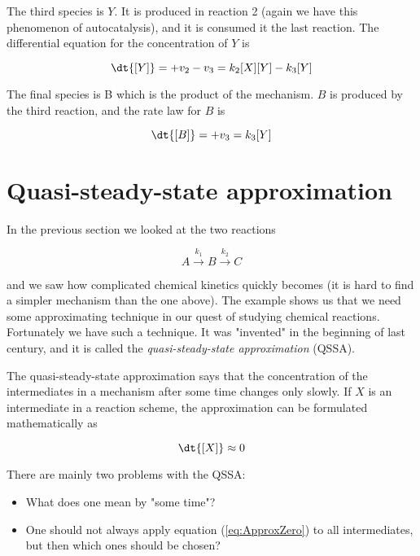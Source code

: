 \begin{example}
    The third species is $Y$. It is produced in reaction 2 (again we have this phenomenon of autocatalysis), and it is consumed it the last reaction. The differential equation for the concentration of $Y$ is

    \begin{equation}
        \dt{[Y]} = +v_2 - v_3 = k_2[X][Y] - k_3[Y]
    \end{equation}

    The final species is B which is the product of the mechanism. $B$ is produced by the third reaction, and the rate law for $B$ is

    \begin{equation}
        \dt{[B]} = +v_3 = k_3[Y]
    \end{equation}
\end{example}

\section{Quasi-steady-state approximation}
\label{sect:QSSA}

In the previous section we looked at the two reactions

\begin{equation}
    A \overset{k_1}{\rightarrow} B \overset{k_2}{\rightarrow} C
\end{equation}

and we saw how complicated chemical kinetics quickly becomes (it is hard to find a simpler mechanism than the one above). The example shows us that we need some approximating technique in our quest of studying chemical reactions. Fortunately we have such a technique. It was "invented" in the beginning of last century, and it is called the \textit{quasi-steady-state approximation} (QSSA).

The quasi-steady-state approximation says that the concentration of the intermediates in a mechanism after some time changes only slowly. If $X$ is an intermediate in a reaction scheme, the approximation can be formulated mathematically as

\begin{equation}
    \label{eq:ApproxZero}
    \dt{[X]} \approx 0
\end{equation}

There are mainly two problems with the QSSA:

\begin{itemize}
    \item What does one mean by "some time"?
    \item One should not always apply equation (\ref{eq:ApproxZero}) to all intermediates, but then which ones should be chosen?
\end{itemize}

